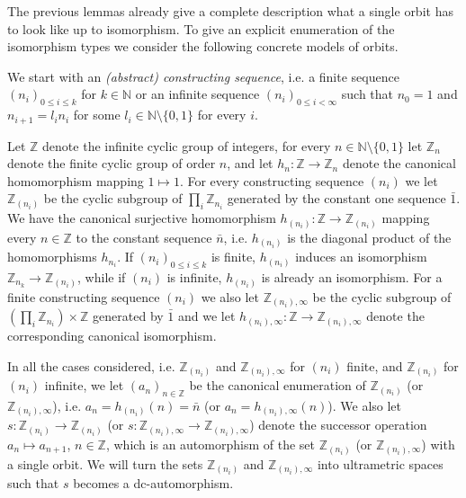 \documentclass[10pt,a4paper]{article}
\theoremstyle{definition}
\theoremstyle{remark}
\newcommand \set [1]{\{#1\}}
\newcommand \maps {\colon} %
\newcommand \N {\mathbb{N}}
\newcommand \Z {\mathbb{Z}}
\begin{document}
The previous lemmas already give a complete description what a single orbit has to look like up to isomorphism.
To give an explicit enumeration of the isomorphism types we consider the following concrete models of orbits.

\medskip

We start with an \emph{(abstract) constructing sequence}, i.e. a finite sequence $(n_i)_{0 \leq i \leq k}$ for $k \in \N$ or an infinite sequence $(n_i)_{0 \leq i < \infty}$ such that $n_0 = 1$ and $n_{i + 1} = l_i n_i$ for some $l_i \in \N \setminus \set{0, 1}$ for every $i$.

Let $\Z$ denote the infinite cyclic group of integers, for every $n \in \N \setminus \set{0, 1}$ let $\Z_n$ denote the finite cyclic group of order $n$, and let $h_n\maps \Z \to \Z_n$ denote the canonical homomorphism mapping $1 \mapsto 1$.
For every constructing sequence $(n_i)$ we let $\Z_{(n_i)}$ be the cyclic subgroup of $\prod_i \Z_{n_i}$ generated by the constant one sequence $\bar{1}$.
We have the canonical surjective homomorphism $h_{(n_i)}\maps \Z \to \Z_{(n_i)}$ mapping every $n \in \Z$ to the constant sequence $\bar{n}$, i.e. $h_{(n_i)}$ is the diagonal product of the homomorphisms $h_{n_i}$.
If $(n_i)_{0 \leq i \leq k}$ is finite, $h_{(n_i)}$ induces an isomorphism $\Z_{n_k} \to \Z_{(n_i)}$, while if $(n_i)$ is infinite, $h_{(n_i)}$ is already an isomorphism.
For a finite constructing sequence $(n_i)$ we also let $\Z_{(n_i), \infty}$ be the cyclic subgroup of $(\prod_i \Z_{n_i}) \times \Z$ generated by $\bar{1}$ and we let $h_{(n_i), \infty}\maps \Z \to \Z_{(n_i), \infty}$ denote the corresponding canonical isomorphism.

In all the cases considered, i.e. $\Z_{(n_i)}$ and $\Z_{(n_i), \infty}$ for $(n_i)$ finite, and $\Z_{(n_i)}$ for $(n_i)$ infinite, we let $(a_n)_{n \in \Z}$ be the canonical enumeration of $\Z_{(n_i)}$ (or $\Z_{(n_i), \infty}$), i.e. $a_n = h_{(n_i)}(n) = \bar{n}$ (or $a_n = h_{(n_i),\infty}(n)$).
We also let $s\maps \Z_{(n_i)} \to \Z_{(n_i)}$ (or $s\maps\Z_{(n_i), \infty} \to \Z_{(n_i), \infty}$) denote the successor operation $a_n \mapsto a_{n + 1}$, $n \in \Z$, which is an automorphism of the set $\Z_{(n_i)}$ (or $\Z_{(n_i), \infty}$) with a single orbit.
We will turn the sets $\Z_{(n_i)}$ and $\Z_{(n_i), \infty}$ into ultrametric spaces such that $s$ becomes a dc-automorphism.
\end{document}
